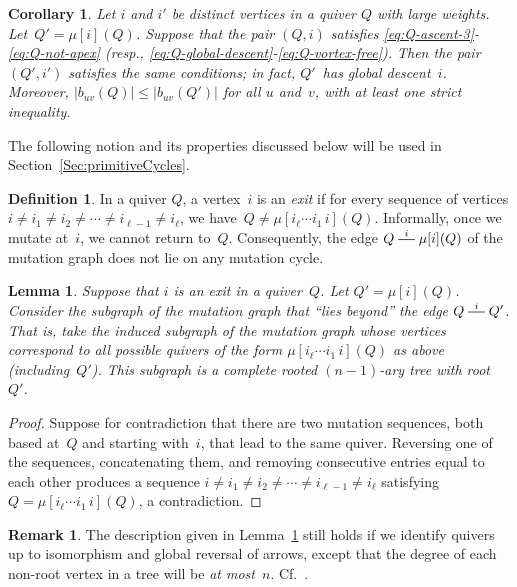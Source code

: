 \documentclass[11pt, letterpaper]{amsart}
\newtheorem{corollary}[theorem]{Corollary}
\newtheorem{lemma}[theorem]{Lemma}
\theoremstyle{definition}
\newtheorem{remark}[theorem]{Remark}
\newtheorem{definition}[theorem]{Definition}
\numberwithin{equation}{section}
\newcommand{\T}[2]{\mu[#1](#2)} %
\newcommand{\shortmutation}[1]{\stackrel{#1}{\rule[.5ex]{1.2em}{0.5pt}}}
\begin{document}
\begin{corollary}
\label{cor:weak-propagates}
Let $i$ and $i'$ be distinct vertices in a quiver $Q$ with large weights.
Let~$Q'=\T{i}{Q}$. 
Suppose that the pair $(Q,i)$ satisfies  \eqref{eq:Q-ascent-3}-\eqref{eq:Q-not-apex} (resp., \eqref{eq:Q-global-descent}-\eqref{eq:Q-vortex-free}). 
Then the pair $(Q',i')$ satisfies the same conditions; 
in fact, $Q'$~has global descent~$i$. 
Moreover, $|b_{uv}(Q)| \leq |b_{uv}(Q')|$ for all $u$ and~$v$, with at least one strict inequality.
\end{corollary}

The following notion and its properties discussed below will be used in Section~\ref{Sec:primitiveCycles}. 

\begin{definition}
\label{def:transient} 
In a quiver $Q$, a vertex~$i$ is an \emph{exit} if for every sequence of vertices 
$i\neq i_1\neq i_2\neq\cdots\neq i_{\ell-1}\neq i_\ell$, we have~$Q \neq \T{i_\ell \cdots i_1\,i}{Q}$. 
Informally, once we mutate at~$i$, we cannot return to~$Q$. 
Consequently, the edge $Q\shortmutation{i} \mu[i](Q)$ of the mutation graph does not lie on any mutation cycle. 
\end{definition}

\begin{lemma}
\label{lem:exit-leads-to-tree}
Suppose that $i$ is an exit in a quiver~$Q$. Let $Q'=\mu[i](Q)$. 
Consider the subgraph of the mutation graph that ``lies beyond'' the edge $Q \shortmutation{i}Q'$. 
That is, take the induced subgraph of the mutation graph whose vertices correspond to all possible quivers of the form $\T{i_\ell \cdots i_1\,i}{Q}$ as above (including~$Q'$). 
This subgraph is a complete rooted $(n-1)$-ary tree with root~$Q'$.
\end{lemma}

\begin{proof}
Suppose for contradiction that there are two mutation sequences, both based at~$Q$ and starting with~$i$, that lead to the same quiver. 
Reversing one of the sequences, concatenating them, and removing consecutive entries equal to each other
produces a sequence  $i\neq i_1\neq i_2\neq\cdots\neq i_{\ell-1}\neq i_\ell$ satisfying $Q = \T{i_\ell \cdots i_1\,i}{Q}$, a contradiction.
\end{proof}

\begin{remark}
The description given in Lemma~\ref{lem:exit-leads-to-tree} still holds 
if we identify quivers up to isomorphism and global reversal of arrows, 
except that the degree of each non-root vertex in a tree will be \emph{at most}~$n$. 
Cf.\ \cite[Lemmas 2.7--2.8]{Warkentin}.
\end{remark}
\end{document}
